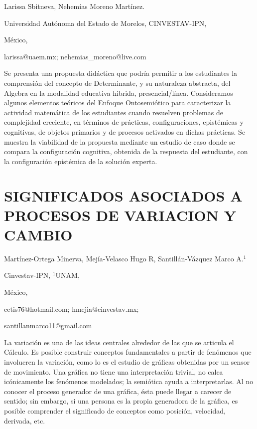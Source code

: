 \begin{datos}

Larissa Sbitneva, Nehemías Moreno Martínez.

Universidad Autónoma del Estado de Morelos, CINVESTAV-IPN,

México,

larissa@uaem.mx; nehemias\_moreno@live.com 

\end{datos}

Se presenta una propuesta didáctica que podría permitir a los estudiantes
la comprensión del concepto de Determinante, y su naturaleza abstracta,
del Algebra en la modalidad educativa hibrida, presencial/línea. Consideramos
algunos elementos teóricos del Enfoque Ontosemiótico para caracterizar
la actividad matemática de los estudiantes cuando resuelven problemas
de complejidad creciente, en términos de prácticas, configuraciones,
epistémicas y cognitivas, de objetos primarios y de procesos activados
en dichas prácticas. Se muestra la viabilidad de la propuesta mediante
un estudio de caso donde se compara la configuración cognitiva, obtenida
de la respuesta del estudiante, con la configuración epistémica de
la solución experta. 


\section{SIGNIFICADOS ASOCIADOS A PROCESOS DE VARIACION Y CAMBIO}

\begin{datos}

Martínez-Ortega Minerva, Mejía-Velasco Hugo R, Santillán-Vázquez Marco
A.$^{1}$

Cinvestav-IPN, $^{1}$UNAM,

México,

cetis76@hotmail.com; hmejia@cinvestav.mx; 

santillanmarco11@gmail.com 

\end{datos}

La variación es una de las ideas centrales alrededor de las que se
articula el Cálculo. Es posible construir conceptos fundamentales
a partir de fenómenos que involucren la variación, como lo es el estudio
de gráficas obtenidas por un sensor de movimiento. Una gráfica no
tiene una interpretación trivial, no calca icónicamente los fenómenos
modelados; la semiótica ayuda a interpretarlas. Al no conocer el proceso
generador de una gráfica, ésta puede llegar a carecer de sentido;
sin embargo, si una persona es la propia generadora de la gráfica,
es posible comprender el significado de conceptos como posición, velocidad,
derivada, etc. 



